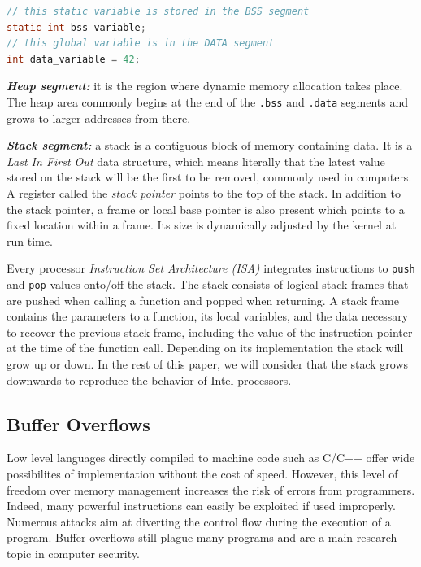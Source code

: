 \documentclass[10pt,twocolumn]{article}
\begin{document}
\begin{lstlisting}[aboveskip=\bigskipamount,belowskip=\medskipamount,caption=Variable
location in memory,language=C] 
// this static variable is stored in the BSS segment
static int bss_variable;
// this global variable is in the DATA segment
int data_variable = 42; 
\end{lstlisting}

\textbf{\textit{Heap segment:}} it is the region where dynamic memory
allocation takes place. The heap area commonly begins at the end of the
\texttt{.bss} and \texttt{.data} segments and grows to larger addresses from
there.

\textit{\textbf{Stack segment:}} a stack is a contiguous block of memory
containing data. It is a \textit{Last In First Out} data structure, which means
literally that the latest value stored on the stack will be the first to be
removed, commonly used
in computers. A register called the \textit{stack pointer} points to
the top of the stack. In addition to the stack pointer, a frame or local base
pointer is also present which points to a fixed location within a frame. Its
size is dynamically adjusted by the kernel at run time.

Every processor \textit{Instruction Set Architecture (ISA)} integrates
instructions to \texttt{push} and \texttt{pop} values onto/off the stack. The stack consists of
logical stack frames that are pushed when calling a function and popped when
returning. A stack frame contains the parameters to a function, its local
variables, and the data necessary to recover the previous stack frame,
including the value of the instruction pointer at the time of the function
call. Depending on its implementation the stack will grow up or down. In the
rest of this paper, we will consider that the stack grows downwards to
reproduce the behavior of Intel processors.

\subsection{Buffer Overflows}

Low level languages directly compiled to machine code such as C/C++ offer wide
possibilites of implementation without the cost of speed. However, this level
of freedom over memory management increases the risk of errors from programmers.
Indeed, many powerful instructions can easily be exploited if used improperly.
Numerous attacks aim at diverting the control flow during the execution of a
program. Buffer overflows still plague many programs and are a main research
topic in computer
security\cite{DBLP:journals/iee/MouzaraniSZ16,DBLP:journals/iee/PadmanabhuniT16,DBLP:conf/ant/LeonB16}.
\end{document}
